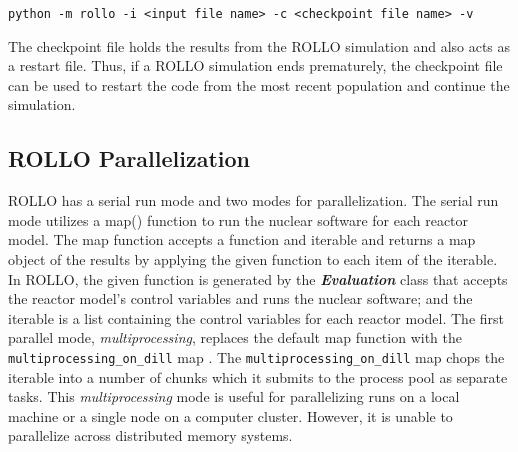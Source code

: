 \noindent
\texttt{python -m rollo -i <input file name> -c <checkpoint file name> -v}

The checkpoint file holds the results from the \gls{ROLLO} simulation and also acts 
as a restart file. 
Thus, if a \gls{ROLLO} simulation ends prematurely, the checkpoint file can be used 
to restart the code from the most recent population and continue the simulation. 

\subsection{ROLLO Parallelization}
\label{sec:rollo_parallel}
\gls{ROLLO} has a serial run mode and two modes for parallelization. 
The serial run mode utilizes a map() function to run the nuclear software for each 
reactor model.
The map function accepts a function and iterable and returns a map object of the results 
by applying the given function to each item of the iterable. 
In \gls{ROLLO}, the given function is generated by the \textbf{\textit{Evaluation}} class 
that accepts the reactor model's control variables and runs the nuclear software;
and the iterable is a list containing the control variables for each reactor model. 
The first parallel mode, \textit{multiprocessing}, replaces the default map function 
with the \texttt{multiprocessing\_on\_dill} map \cite{smallshire_multiprocessing_on_dill_nodate}.
The \texttt{multiprocessing\_on\_dill} map chops the iterable into a number of chunks 
which it submits to the process pool as separate tasks.
This \textit{multiprocessing} mode is useful for parallelizing runs on a local machine or 
a single node on a computer cluster. 
However, it is unable to parallelize across distributed memory systems.

